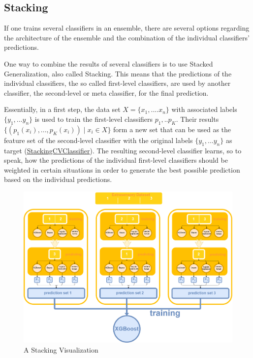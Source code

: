 \subsection{Stacking}\label{subsec:stacking}

If one trains several classifiers in an ensemble, there are several options regarding the architecture of the ensemble and the combination of the individual classifiers' predictions.

One way to combine the results of several classifiers is to use Stacked Generalization, also called Stacking. This means that the predictions of the individual classifiers, the so called first-level classifiers, are used by another classifier, the second-level or meta classifier, for the final prediction. 

Essentially, in a first step, the data set $X = \{x_1, ... .x_n\}$ with associated labels $\{y_1, ... y_n\}$ is used to train the first-level classifiers $p_1, .. p_K$. Their results $\{(p_1(x_i), ... , p_K(x_i)) \mid x_i \in X\}$ form a new set that can be used as the feature set of the second-level classifier with the original labels $\{y_1, ... y_n\}$ as target (\href{https://books.google.de/books?id=nwQZCwAAQBAJ&lpg=PA500&dq=stacking+classifier+subsets&pg=PA499&redir_esc=y#v=onepage&q&f=false}{StackingCVClassifier}).
The resulting second-level classifier learns, so to speak, how the predictions of the individual first-level classifiers should be weighted in certain situations in order to generate the best possible prediction based on the individual predictions. 
\begin{figure}[H]
	\begin{center}
		\includegraphics[width=\textwidth]{images/stacking_diagram.png}
		\caption{A Stacking Visualization}
		\label{abb:stacking}
	\end{center}		
\end{figure}	

